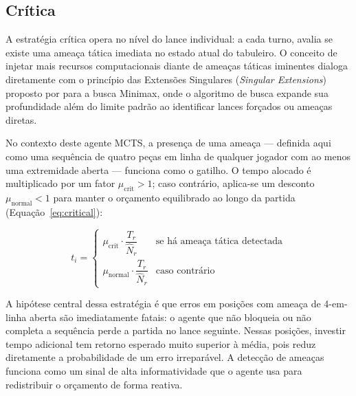 \documentclass[cic,tc]{iiufrgs}
\begin{document}
\subsection{Crítica}
\label{sec:strategy_critical}

A estratégia crítica opera no nível do lance individual: a cada turno, avalia se existe uma ameaça tática imediata no estado atual do tabuleiro. O conceito de injetar mais recursos computacionais diante de ameaças táticas iminentes dialoga diretamente com o princípio das Extensões Singulares (\emph{Singular Extensions}) proposto por \citet{anantharaman1990singular} para a busca Minimax, onde o algoritmo de busca expande sua profundidade além do limite padrão ao identificar lances forçados ou ameaças diretas.

No contexto deste agente MCTS, a presença de uma ameaça — definida aqui como uma sequência de quatro peças em linha de qualquer jogador com ao menos uma extremidade aberta — funciona como o gatilho. O tempo alocado é multiplicado por um fator $\mu_{\text{crit}} > 1$; caso contrário, aplica-se um desconto $\mu_{\text{normal}} < 1$ para manter o orçamento equilibrado ao longo da partida (Equação~\ref{eq:critical}):

\begin{equation}
    t_i =
    \begin{cases}
        \mu_{\text{crit}} \cdot \dfrac{T_r}{\hat{N}_r}    & \text{se há ameaça tática detectada}  \\[6pt]
        \mu_{\text{normal}} \cdot \dfrac{T_r}{\hat{N}_r}  & \text{caso contrário}
    \end{cases}
\label{eq:critical}
\end{equation}

A hipótese central dessa estratégia é que erros em posições com ameaça de 4-em-linha aberta são imediatamente fatais: o agente que não bloqueia ou não completa a sequência perde a partida no lance seguinte. Nessas posições, investir tempo adicional tem retorno esperado muito superior à média, pois reduz diretamente a probabilidade de um erro irreparável. A detecção de ameaças funciona como um sinal de alta informatividade que o agente usa para redistribuir o orçamento de forma reativa.
\end{document}
